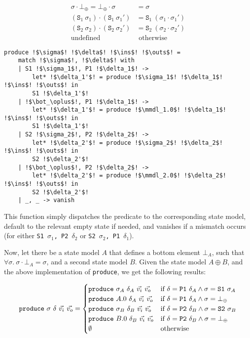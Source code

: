 \documentclass[,a4paper,oneside]{article}
\newcommand{\code}[1]{\texttt{#1}}
\newcommand{\mmdl}{\ensuremath{\mathbb S}}
\begin{document}
\begin{align*}
	\sigma \cdot \bot_\oplus=\bot_\oplus\cdot\sigma&=\sigma\\
	(\code{S}_1~\sigma_1)\cdot(\code S_1~\sigma_1') &= \code S_1~(\sigma_1\cdot \sigma_1')\\
	(\code{S}_2~\sigma_2)\cdot(\code S_2~\sigma_2') &= \code S_2~(\sigma_2\cdot \sigma_2')\\
	\text{undefined}&\text{ otherwise}
\end{align*}


\begin{verbatim}
produce !$\sigma$! !$\delta$! !$\ins$! !$\outs$! =
    match !$\sigma$!, !$\delta$! with
    | S1 !$\sigma_1$!, P1 !$\delta_1$! -> 
        let* !$\delta_1'$! = produce !$\sigma_1$! !$\delta_1$! !$\ins$! !$\outs$! in
        S1 !$\delta_1'$!
    | !$\bot_\oplus$!, P1 !$\delta_1$! ->
    	let* !$\delta_1'$! = produce !$\mmdl_1.0$! !$\delta_1$! !$\ins$! !$\outs$! in
        S1 !$\delta_1'$!
    | S2 !$\sigma_2$!, P2 !$\delta_2$! -> 
        let* !$\delta_2'$! = produce !$\sigma_2$! !$\delta_2$! !$\ins$! !$\outs$! in
        S2 !$\delta_2'$!
    | !$\bot_\oplus$!, P2 !$\delta_2$! -> 
        let* !$\delta_2'$! = produce !$\mmdl_2.0$! !$\delta_2$! !$\ins$! !$\outs$! in
        S2 !$\delta_2'$!
    | _, _ -> vanish
\end{verbatim}

This function simply dispatches the predicate to the corresponding state model, default to the relevant empty state if needed, and vanishes if a mismatch occurs (for either \code{S1 $\sigma_1$, P2 $\delta_2$} or \code{S2 $\sigma_2$, P1 $\delta_1$}).

Now, let there be a state model $A$ that defines a bottom element $\bot_A$, such that $\forall \sigma.~\sigma \cdot\bot_A = \sigma$, and a second state model $B$. Given the state model $A\oplus B$, and the above implementation of \code{produce}, we get the following results:

\begin{align}
	\code{produce}~\sigma~\delta~\ins~\outs = \begin{cases}
		\code{produce}~\sigma_A~\delta_A~\ins~\outs 
			& \text{if }\delta=\code{P1}~\delta_A\land\sigma=\code{S1}~\sigma_A\\
		\code{produce}~A.0~\delta_A~\ins~\outs 
			& \text{if }\delta=\code{P1}~\delta_A\land\sigma=\bot_\oplus\\
		\code{produce}~\sigma_B~\delta_B~\ins~\outs 
			& \text{if }\delta=\code{P2}~\delta_B\land\sigma=\code{S2}~\sigma_B\\
		\code{produce}~B.0~\delta_B~\ins~\outs 
			& \text{if }\delta=\code{P2}~\delta_B\land\sigma=\bot_\oplus\\
		\emptyset & \text{otherwise}
	\end{cases}
\end{align}
\end{document}
